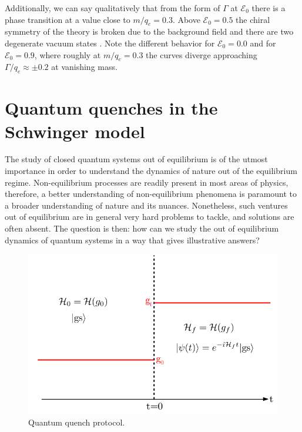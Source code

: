 Additionally, we can say qualitatively that from the form of $\Gamma$ at $\mathcal{E}_0$ there is a phase transition at a value close to $m/q_e = 0.3$.  Above $\mathcal{E}_0=0.5$ the chiral symmetry of the theory is broken due to the background field and there are two degenerate vacuum states \cite{Coleman1976,Hamer1997}. Note the different behavior for $\mathcal{E}_0=0.0$ and for $\mathcal{E}_0=0.9$, where roughly at $m/q_e = 0.3$ the curves diverge approaching $\Gamma/q_e \approx \pm 0.2$ at vanishing mass.

\section{Quantum quenches in the Schwinger model}

The study of closed quantum systems out of equilibrium is of the utmost importance in order to understand the dynamics of nature out of the equilibrium regime. Non-equilibrium processes are readily present in most areas of physics, therefore, a better understanding of non-equilibrium phenomena is paramount to a broader understanding of nature and its nuances. Nonetheless, such ventures out of equilibrium are in general very hard problems to tackle, and solutions are often absent. The question is then: how can we study the out of equilibrium dynamics of quantum systems in a way that gives illustrative answers?\\

\begin{figure}[h]
	\centering
	\includegraphics[scale=0.35]{figures/quenchProt}
	\caption{Quantum quench protocol.}
	\label{fig:quenchprot}
\end{figure}


